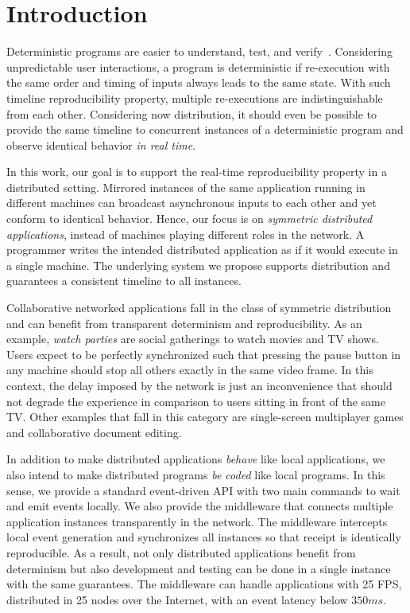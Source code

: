 \documentclass[sigplan,screen]{acmart}
\begin{document}
\maketitle

\section{Introduction}

Deterministic programs are easier to understand, test, and verify~\cite{det}.
Considering unpredictable user interactions, a program is deterministic if
re-execution with the same order and timing of inputs always leads to the same
state.
With such timeline reproducibility property, multiple re-executions are
indistinguishable from each other.
Considering now distribution, it should even be possible to provide the same
timeline to concurrent instances of a deterministic program and observe
identical behavior \emph{in real time}.

In this work, our goal is to support the real-time reproducibility property in
a distributed setting.
Mirrored instances of the same application running in different machines can
broadcast asynchronous inputs to each other and yet conform to
identical behavior.
Hence, our focus is on \emph{symmetric distributed applications}, instead of
machines playing different roles in the network.
A programmer writes the intended distributed application as if it would execute
in a single machine.
The underlying system we propose supports distribution and guarantees a
consistent timeline to all instances.

Collaborative networked applications fall in the class of symmetric
distribution and can benefit from transparent determinism and reproducibility.
As an example, \emph{watch parties} are social gatherings to watch movies and
TV shows.
Users expect to be perfectly synchronized such that pressing the pause button
in any machine should stop all others exactly in the same video frame.
In this context, the delay imposed by the network is just an inconvenience that
should not degrade the experience in comparison to users sitting in front of
the same TV.
Other examples that fall in this category are single-screen multiplayer games
and collaborative document editing.

In addition to make distributed applications \emph{behave} like local
applications, we also intend to make distributed programs \emph{be coded} like
local programs.
In this sense, we provide a standard event-driven API with two main commands
to wait and emit events locally.
We also provide the middleware that connects multiple application instances
transparently in the network.
The middleware intercepts local event generation and synchronizes all instances
so that receipt is identically reproducible.
As a result, not only distributed applications benefit from determinism but
also development and testing can be done in a single instance with the same
guarantees.
The middleware can handle applications with 25 FPS, distributed in 25 nodes
over the Internet, with an event latency below $350ms$.
\end{document}
